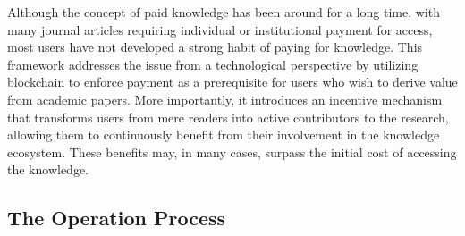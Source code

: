 \documentclass[lettersize,journal]{IEEEtran}
\begin{document}
Although the concept of paid knowledge has been around for a long time, with many journal articles requiring individual or institutional payment for access, most users have not developed a strong habit of paying for knowledge. This framework addresses the issue from a technological perspective by utilizing blockchain to enforce payment as a prerequisite for users who wish to derive value from academic papers. More importantly, it introduces an incentive mechanism that transforms users from mere readers into active contributors to the research, allowing them to continuously benefit from their involvement in the knowledge ecosystem. These benefits may, in many cases, surpass the initial cost of accessing the knowledge.



\subsection{The Operation Process}
\end{document}
